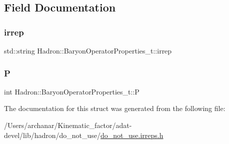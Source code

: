 \subsection{Field Documentation}
\mbox{\label{structHadron_1_1BaryonOperatorProperties__t_a4356cd638575da7c5dd5e43fdeed7130}} 
\subsubsection{\texorpdfstring{irrep}{irrep}}
{\footnotesize\ttfamily std\+::string Hadron\+::\+Baryon\+Operator\+Properties\+\_\+t\+::irrep}

\mbox{\label{structHadron_1_1BaryonOperatorProperties__t_abb8040bfa73ba989712f04a7d723da10}} 
\subsubsection{\texorpdfstring{P}{P}}
{\footnotesize\ttfamily int Hadron\+::\+Baryon\+Operator\+Properties\+\_\+t\+::P}



The documentation for this struct was generated from the following file\+:\begin{DoxyCompactItemize}
\item 
/\+Users/archanar/\+Kinematic\+\_\+factor/adat-\/devel/lib/hadron/do\+\_\+not\+\_\+use/\mbox{\hyperlink{adat-devel_2lib_2hadron_2do__not__use_2do__not__use_8irreps_8h}{do\+\_\+not\+\_\+use.\+irreps.\+h}}\end{DoxyCompactItemize}
